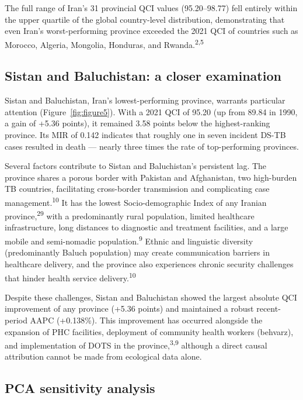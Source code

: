 \documentclass[12pt]{article}
\begin{document}
The full range of Iran's 31 provincial QCI values (95.20--98.77) fell entirely within the upper quartile of the global country-level distribution, demonstrating that even Iran's worst-performing province exceeded the 2021 QCI of countries such as Morocco, Algeria, Mongolia, Honduras, and Rwanda.\textsuperscript{2,5}

\subsection{Sistan and Baluchistan: a closer examination}

Sistan and Baluchistan, Iran's lowest-performing province, warrants particular attention (Figure~\ref{fig:figure5}). With a 2021 QCI of 95.20 (up from 89.84 in 1990, a gain of +5.36 points), it remained 3.58 points below the highest-ranking province. Its MIR of 0.142 indicates that roughly one in seven incident DS-TB cases resulted in death --- nearly three times the rate of top-performing provinces.

Several factors contribute to Sistan and Baluchistan's persistent lag. The province shares a porous border with Pakistan and Afghanistan, two high-burden TB countries, facilitating cross-border transmission and complicating case management.\textsuperscript{10} It has the lowest Socio-demographic Index of any Iranian province,\textsuperscript{29} with a predominantly rural population, limited healthcare infrastructure, long distances to diagnostic and treatment facilities, and a large mobile and semi-nomadic population.\textsuperscript{9} Ethnic and linguistic diversity (predominantly Baluch population) may create communication barriers in healthcare delivery, and the province also experiences chronic security challenges that hinder health service delivery.\textsuperscript{10}

Despite these challenges, Sistan and Baluchistan showed the largest absolute QCI improvement of any province (+5.36 points) and maintained a robust recent-period AAPC (+0.138\%). This improvement has occurred alongside the expansion of PHC facilities, deployment of community health workers (behvarz), and implementation of DOTS in the province,\textsuperscript{3,9} although a direct causal attribution cannot be made from ecological data alone.

\subsection{PCA sensitivity analysis}
\end{document}
